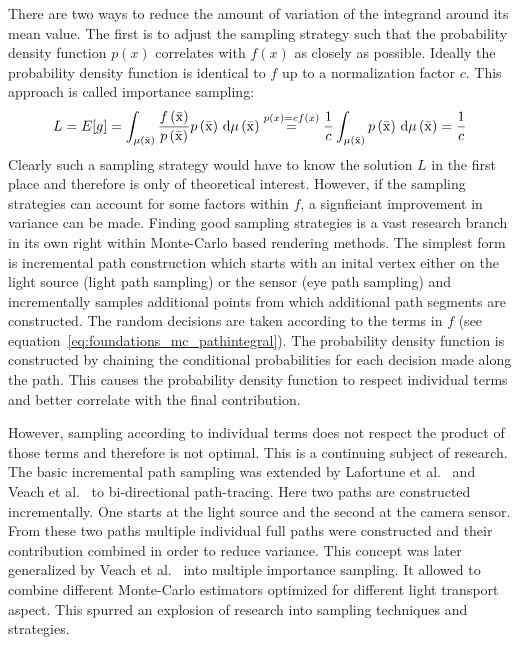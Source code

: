There are two ways to reduce the amount of variation of the integrand around its mean value. The first is to adjust the sampling strategy such that the probability density function $p\left(x\right)$ correlates with $f\left(x\right)$ as closely as possible. Ideally the probability density function is identical to $f$ up to a normalization factor $c$. This approach is called importance sampling:
\begin{align}
L = E[g] =
\int_{\mu\left(\bar{\mathrm{x}}\right)} \frac{f\left(\bar{\mathrm{x}}\right)}{p\left(\bar{\mathrm{x}}\right)}p\left(\bar{\mathrm{x}}\right)
\,\mathrm{d}\mu\left(\bar{\mathrm{x}}\right)
\stackrel{p\left(x\right)=c f\left(x\right)}{=}
\frac{1}{c}\int_{\mu\left(\bar{\mathrm{x}}\right)} p\left(\bar{\mathrm{x}}\right)
\,\mathrm{d}\mu\left(\bar{\mathrm{x}}\right) = \frac{1}{c}
\end{align}
Clearly such a sampling strategy would have to know the solution $L$ in the first place and therefore is only of theoretical interest. However, if the sampling strategies can account for some factors within $f$, a signficiant improvement in variance can be made. Finding good sampling strategies is a vast research branch in its own right within Monte-Carlo based rendering methods. The simplest form is incremental path construction which starts with an inital vertex either on the light source (light path sampling) or the sensor (eye path sampling) and incrementally samples additional points from which additional path segments are constructed. The random decisions are taken according to the terms in $f$ (see equation~\ref{eq:foundations_mc_pathintegral}). The probability density function is constructed by chaining the conditional probabilities for each decision made along the path. This causes the probability density function to respect individual terms and better correlate with the final contribution. 

However, sampling according to individual terms does not respect the product of those terms and therefore is not optimal. This is a continuing subject of research. The basic incremental path sampling was extended by Lafortune et al.~\cite{Lafortune93} and Veach et al.~\cite{Veach94} to bi-directional path-tracing. Here two paths are constructed incrementally. One starts at the light source and the second at the camera sensor. From these two paths multiple individual full paths were constructed and their contribution combined in order to reduce variance. This concept was later generalized by Veach et al.~\cite{Veach95MIS} into multiple importance sampling. It allowed to combine different Monte-Carlo estimators optimized for different light transport aspect. This spurred an explosion of research into sampling techniques and strategies.

